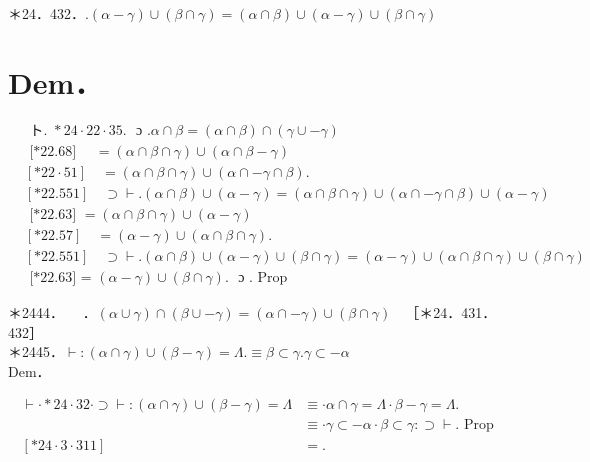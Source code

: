 \documentclass[10pt]{article}
\begin{document}
＊24．432．$.(\alpha-\gamma) \cup(\beta \cap \gamma)=(\alpha \cap \beta) \cup(\alpha-\gamma) \cup(\beta \cap \gamma)$

\section*{Dem．}
$$
\begin{aligned}
& \text { ト. } * 24 \cdot 22 \cdot 35 \text {. } \text { ɔ } . \alpha \cap \beta=(\alpha \cap \beta) \cap(\gamma \cup-\gamma) \\
& \text { [*22.68] } \quad=(\alpha \cap \beta \cap \gamma) \cup(\alpha \cap \beta-\gamma) \\
& {[* 22 \cdot 51] \quad=(\alpha \cap \beta \cap \gamma) \cup(\alpha \cap-\gamma \cap \beta) .} \\
& {[* 22.551] \quad \supset \vdash .(\alpha \cap \beta) \cup(\alpha-\gamma)=(\alpha \cap \beta \cap \gamma) \cup(\alpha \cap-\gamma \cap \beta) \cup(\alpha-\gamma)} \\
& \text { [*22.63] }=(\alpha \cap \beta \cap \gamma) \cup(\alpha-\gamma) \\
& {[* 22.57] \quad=(\alpha-\gamma) \cup(\alpha \cap \beta \cap \gamma) .} \\
& {[* 22.551] \quad \supset \vdash .(\alpha \cap \beta) \cup(\alpha-\gamma) \cup(\beta \cap \gamma)=(\alpha-\gamma) \cup(\alpha \cap \beta \cap \gamma) \cup(\beta \cap \gamma)} \\
& \text { [*22.63] = }(\alpha-\gamma) \cup(\beta \cap \gamma) \text {. } \text { ɔ } \text {. Prop }
\end{aligned}
$$

＊2444．$\quad$ ．$(\alpha \cup \gamma) \cap(\beta \cup-\gamma)=(\alpha \cap-\gamma) \cup(\beta \cap \gamma) \quad$［＊24．431．432］\\
＊2445．$\vdash:(\alpha \cap \gamma) \cup(\beta-\gamma)=\Lambda . \equiv \beta \subset \gamma . \gamma \subset-\alpha$\\
Dem．

$$
\begin{aligned}
\vdash \cdot * 24 \cdot 32 \cdot \supset \vdash:(\alpha \cap \gamma) \cup(\beta-\gamma)=\Lambda & \equiv \cdot \alpha \cap \gamma=\Lambda \cdot \beta-\gamma=\Lambda . \\
& \equiv \cdot \gamma \subset-\alpha \cdot \beta \subset \gamma: \supset \vdash . \text { Prop } \\
{[* 24 \cdot 3 \cdot 311] } & =.
\end{aligned}
$$
\end{document}
